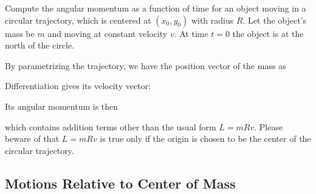 \documentclass[class=article, crop=false, 12pt]{standalone}
\begin{document}
\begin{enumerate}
\end{enumerate}

\begin{example}
    Compute the angular momentum as a function of time for an object moving in a circular trajectory,
    which is centered at $(x_0,y_0)$ with radius $R$.
    Let the object's mass be $m$ and moving at constant velocity $v$. 
    At time $t=0$ the object is at the north of the circle.
    

    By parametrizing the trajectory, we have the position vector of the mass as
    
    Differentiation gives its velocity vector:

    Its angular momentum is then

    which contains addition terms other than the usual form $L=mRv$. 
    Please beware of that $L=mRv$ is true only if the origin is chosen to be the center of the circular trajectory.
\end{example}


\subsection{Motions Relative to Center of Mass}
\end{document}

